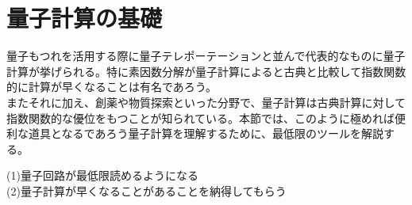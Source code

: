 \documentclass[a4paper,10.5pt]{article}
\numberwithin{equation}{section}
\begin{document}
\section{量子計算の基礎}
量子もつれを活用する際に量子テレポーテーションと並んで代表的なものに量子計算が挙げられる。特に素因数分解が量子計算によると古典と比較して指数関数的に計算が早くなることは有名であろう。\\
またそれに加え、創薬や物質探索といった分野で、量子計算は古典計算に対して指数関数的な優位をもつことが知られている。本節では、このように極めれば便利な道具となるであろう量子計算を理解するために、最低限のツールを解説する。
\begin{goalbox}
(1)量子回路が最低限読めるようになる\\
(2)量子計算が早くなることがあることを納得してもらう
\end{goalbox}
\end{document}
